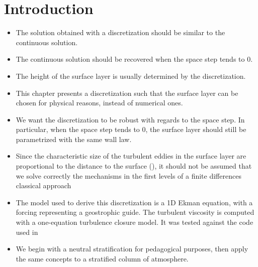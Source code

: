 \section{Introduction}
\begin{itemize}
\item The solution obtained with a discretization
	should be similar to the continuous solution.
\item The continuous solution should be recovered when
	the space step tends to 0.
\item The height of the surface layer
	is usually determined by the discretization.
\item This chapter presents a discretization such that
	the surface layer can be chosen for physical reasons,
		instead of numerical ones.
\item We want the discretization to be robust with regards to
	the space step. In particular, when the space step
		tends to 0, the surface layer should still
		be parametrized with the same wall law.
\item Since the characteristic
	size of the turbulent eddies in the surface layer are
		proportional to the distance to the surface (\cite{kawai_wall-modeling_2012}),
		it should not be assumed that we solve
		correctly the mechanisms in the first levels
		of a finite differences classical approach
\item The model used to derive this discretization is a 1D Ekman
	equation, with a forcing representing a geostrophic guide.
		The turbulent viscosity is computed with a
		one-equation turbulence closure model. It was
		tested against the code used in \cite{lemarie_simplified_2021}
\item We begin with a neutral stratification for pedagogical purposes,
	then apply the same concepts to a stratified column of
		atmosphere.
\end{itemize}
